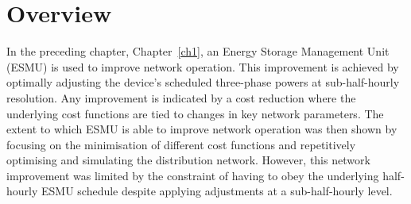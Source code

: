 \section{Overview}
\label{ch2:sec:overview}



In the preceding chapter, Chapter~\ref{ch1}, an Energy Storage Management Unit (ESMU) is used to improve network operation.
This improvement is achieved by optimally adjusting the device's scheduled three-phase powers at sub-half-hourly resolution.
Any improvement is indicated by a cost reduction where the underlying cost functions are tied to changes in key network parameters.
The extent to which ESMU is able to improve network operation was then shown by focusing on the minimisation of different cost functions and repetitively optimising and simulating the distribution network.
However, this network improvement was limited by the constraint of having to obey the underlying half-hourly ESMU schedule despite applying adjustments at a sub-half-hourly level.

